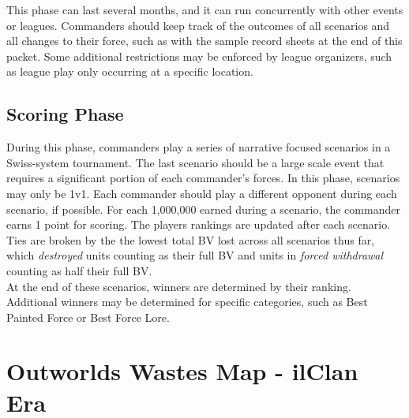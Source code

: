 \documentclass[UTF8]{article}
\begin{document}
This phase can last several months, and it can run concurrently with other events or leagues.
Commanders should keep track of the outcomes of all scenarios and all changes to their force, such as with the sample record sheets at the end of this packet.
Some additional restrictions may be enforced by league organizers, such as league play only occurring at a specific location.

\subsection{Scoring Phase}

During this phase, commanders play a series of narrative focused scenarios in a Swiss-system tournament.
The last scenario should be a large scale event that requires a significant portion of each commander's forces.
In this phase, scenarios may only be 1v1.
Each commander should play a different opponent during each scenario, if possible.
For each 1,000,000 earned during a scenario, the commander earns 1 point for scoring.
The players rankings are updated after each scenario.
Ties are broken by the the lowest total BV lost across all scenarios thus far, which \emph{destroyed} units counting as their full BV and units in \emph{forced withdrawal} counting as half their full BV.\\

At the end of these scenarios, winners are determined by their ranking.
Additional winners may be determined for specific categories, such as Best Painted Force or Best Force Lore.

\newpage

\section{Outworlds Wastes Map - ilClan Era}

\begin{figure}[h!]
  \centering
\end{figure}
\end{document}
